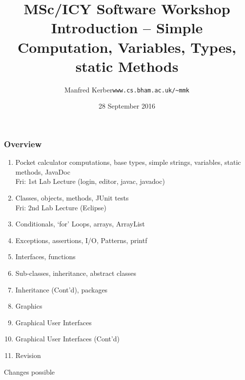 \documentclass{beamer}
\def\mcolor#1#2{\rule{0ex}{0ex}\color{#1}#2\color{black}{}}
\begin{document}
\title{MSc/ICY Software Workshop\\
Introduction -- Simple Computation, Variables, Types, static Methods}

\author[Manfred~Kerber]{\begin{tabular}{ll}
\mcolor{blue}{Manfred Kerber} &   {\tt www.cs.bham.ac.uk/\~{}mmk}\\
\end{tabular}}

\date{28 September 2016}

\begin{frame}
\titlepage


\end{frame}

\begin{frame}
\frametitle{Overview}

\begin{enumerate}
\item Pocket calculator computations, base types, simple strings, variables, static methods, JavaDoc\\
Fri: 1st Lab Lecture (login, editor, javac, javadoc)

\item Classes, objects, methods, JUnit tests\\
Fri: 2nd Lab Lecture (Eclipse)

\item Conditionals, `for' Loops, arrays, ArrayList\\

\item Exceptions, assertions, I/O, Patterns, printf

\item Interfaces, functions

\item Sub-classes, inheritance, abstract classes

\item Inheritance (Cont'd), packages

\item Graphics

\item Graphical User Interfaces

\item Graphical User Interfaces (Cont'd)

\item Revision
\end{enumerate}
Changes possible
\end{frame}
\end{document}
